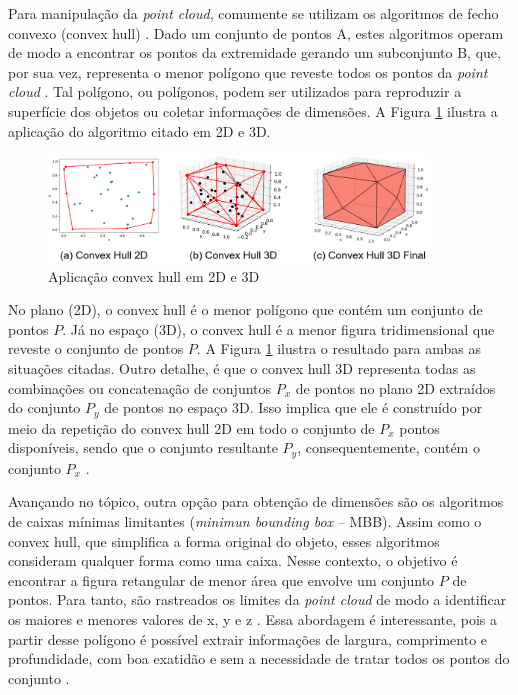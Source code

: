    Para manipulação da \textit{point cloud}, comumente se utilizam os algoritmos de fecho convexo (convex hull) \cite{ding_2018_a}. Dado um conjunto de pontos A, estes algoritmos operam de modo a encontrar os pontos da extremidade gerando um subconjunto B, que, por sua vez, representa o menor polígono que reveste todos os pontos da \textit{point cloud} \cite{zhao_2018_3d}. Tal polígono, ou polígonos, podem ser utilizados para reproduzir a superfície dos objetos ou coletar informações de dimensões. A Figura \ref{fig:AplicacaoConvexHull2D3D} ilustra a aplicação do algoritmo citado em 2D e 3D.

        \begin{figure}[h]
           \centering
           \includegraphics[width=0.9\textwidth]{imagens/aplicacaoConvexHullEmPtCloud2D3D.png} 
           \caption{Aplicação convex hull em 2D e 3D}
           \label{fig:AplicacaoConvexHull2D3D}
        \end{figure}


    No plano (2D), o convex hull é o menor polígono que contém um conjunto de pontos $P$. Já no espaço (3D), o convex hull  é a menor figura tridimensional que reveste o conjunto de pontos $P$. A Figura \ref{fig:AplicacaoConvexHull2D3D} ilustra o resultado para ambas as situações citadas. Outro detalhe, é que o convex hull 3D representa todas as combinações ou concatenação de conjuntos $P_x$ de pontos no plano 2D extraídos do conjunto $P_y$ de pontos no espaço 3D. Isso implica que ele é construído por meio da repetição do convex hull 2D em todo o conjunto de $P_x$ pontos disponíveis, sendo que o conjunto resultante $P_y$, consequentemente, contém o conjunto $P_x$ \cite{zhao_2018_3d,laurini_2017_geographic}. 
	
   


    Avançando no tópico, outra opção para obtenção de dimensões são os algoritmos de caixas mínimas limitantes (\textit{minimun bounding box} -- MBB). Assim como o convex hull, que simplifica a forma original do objeto, esses algoritmos consideram qualquer forma como uma caixa. Nesse contexto, o objetivo é encontrar a figura retangular de menor área que envolve um conjunto $P$ de pontos. Para tanto, são rastreados os limites da \textit{point cloud} de modo a identificar os maiores e menores valores de x, y e z \cite{siwei_2021_review}. Essa abordagem é interessante, pois a partir desse polígono é possível extrair informações de largura, comprimento e profundidade, com boa exatidão e sem a necessidade de tratar todos os pontos do conjunto \cite{actorsfit_2021_pcl_pcaminimum}. 
    
